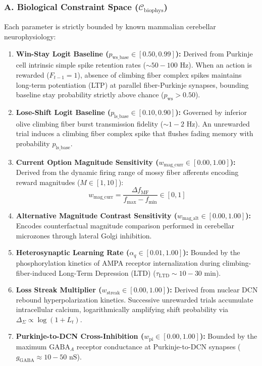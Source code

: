 \documentclass[11pt,twoside,a4paper]{article}
\begin{document}
\subsubsection{A. Biological Constraint Space ($\mathcal{C}_{\text{biophys}}$)}
Each parameter is strictly bounded by known mammalian cerebellar neurophysiology:
\begin{enumerate}
    \item \textbf{Win-Stay Logit Baseline ($p_{\text{ws\_base}} \in [0.50, 0.99]$):} Derived from Purkinje cell intrinsic simple spike retention rates ($\sim 50-100\text{ Hz}$). When an action is rewarded ($F_{t-1} = 1$), absence of climbing fiber complex spikes maintains long-term potentiation (LTP) at parallel fiber-Purkinje synapses, bounding baseline stay probability strictly above chance ($p_{\text{ws}} > 0.50$).
    \item \textbf{Lose-Shift Logit Baseline ($p_{\text{ls\_base}} \in [0.10, 0.90]$):} Governed by inferior olive climbing fiber burst transmission fidelity ($\sim 1-2\text{ Hz}$). An unrewarded trial induces a climbing fiber complex spike that flushes fading memory with probability $p_{\text{ls\_base}}$.
    \item \textbf{Current Option Magnitude Sensitivity ($w_{\text{mag\_curr}} \in [0.00, 1.00]$):} Derived from the dynamic firing range of mossy fiber afferents encoding reward magnitudes ($M \in [1, 10]$):
    \begin{equation}
    w_{\text{mag\_curr}} = \frac{\Delta f_{\text{MF}}}{f_{\text{max}} - f_{\text{min}}} \in [0, 1]
    \end{equation}
    \item \textbf{Alternative Magnitude Contrast Sensitivity ($w_{\text{mag\_alt}} \in [0.00, 1.00]$):} Encodes counterfactual magnitude comparison performed in cerebellar microzones through lateral Golgi inhibition.
    \item \textbf{Heterosynaptic Learning Rate ($\alpha_q \in [0.01, 1.00]$):} Bounded by the phosphorylation kinetics of AMPA receptor internalization during climbing-fiber-induced Long-Term Depression (LTD) ($\tau_{\text{LTD}} \sim 10-30\text{ min}$).
    \item \textbf{Loss Streak Multiplier ($w_{\text{streak}} \in [0.00, 1.00]$):} Derived from nuclear DCN rebound hyperpolarization kinetics. Successive unrewarded trials accumulate intracellular calcium, logarithmically amplifying shift probability via $\Delta_{\Sigma} \propto \log(1 + L_t)$.
    \item \textbf{Purkinje-to-DCN Cross-Inhibition ($w_{\text{pi}} \in [0.00, 1.00]$):} Bounded by the maximum $\text{GABA}_A$ receptor conductance at Purkinje-to-DCN synapses ($g_{\text{GABA}} \approx 10-50\text{ nS}$).

\end{enumerate}
\end{document}
